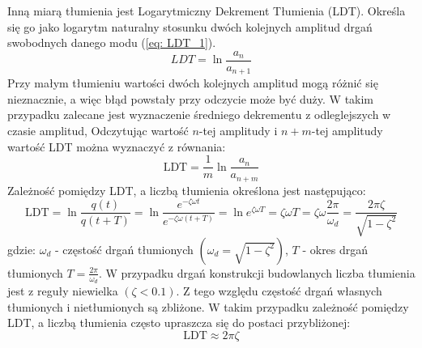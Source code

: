 Inną miarą tłumienia jest Logarytmiczny Dekrement Tłumienia (LDT). Określa się go jako logarytm naturalny stosunku dwóch kolejnych amplitud drgań swobodnych danego modu (\ref{eq: LDT_1}).
\begin{equation} \label{eq: LDT_1}
	LDT = \ln{\frac{a_n}{a_{n+1}}}
\end{equation}
Przy małym tłumieniu wartości dwóch kolejnych amplitud mogą różnić się nieznacznie, a więc błąd powstały przy odczycie może być duży. W takim przypadku zalecane jest wyznaczenie średniego dekrementu z odleglejszych w czasie amplitud, Odczytując wartość $n$-tej amplitudy i $n+m$-tej amplitudy wartość LDT można wyznaczyć z równania:
 \begin{equation} \label{eq: LDT_N}
 	\text{LDT} = \frac{1}{m}\ln{\frac{a_n}{a_{n+m}}}
 \end{equation}
Zależność pomiędzy LDT, a liczbą tłumienia określona jest następująco:
 \begin{equation} \label{eq: LDT_dampingratio}
	\text{LDT} = \ln{\frac{q(t)}{q(t+T)}}=\ln{\frac{e^{-\zeta\omega t}}{e^{-\zeta\omega(t+T)}}} =\ln{e^{\zeta\omega T}}=\zeta\omega T = \zeta\omega\frac{2\pi}{\omega_d}=\frac{2\pi\zeta}{\sqrt{1-\zeta^2}}
\end{equation}
gdzie: $\omega_d$ - częstość drgań tłumionych $(\omega_d=\sqrt{1-\zeta^2})$, $T$ - okres drgań tłumionych $T=\frac{2\pi}{\omega_d}$. W przypadku drgań konstrukcji budowlanych liczba tłumienia jest z reguły niewielka $(\zeta<0.1)$. Z tego względu częstość drgań własnych tłumionych i nietłumionych są zbliżone. W takim przypadku zależność pomiędzy LDT, a liczbą tłumienia często upraszcza się do postaci przybliżonej:
\begin{equation}
\text{LDT} \approx 2\pi\zeta
\end{equation}

